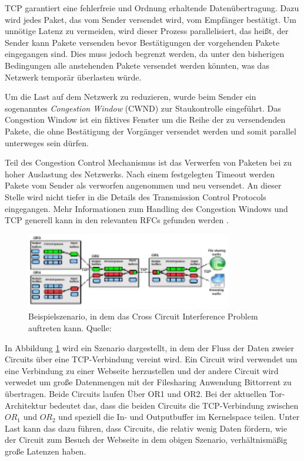 \documentclass[fleqn,envcountsame,runningheads,10pt,a4paper]{llncs}
\begin{document}
TCP garantiert eine fehlerfreie und Ordnung erhaltende Datenübertragung. Dazu 
wird jedes Paket, das vom Sender versendet wird, vom Empfänger bestätigt. Um 
unnötige Latenz zu vermeiden, wird dieser Prozess parallelisiert, das heißt, der 
Sender kann Pakete versenden bevor Bestätigungen der vorgehenden Pakete 
eingegangen sind. Dies muss jedoch begrenzt werden, da unter den bisherigen 
Bedingungen alle anstehenden Pakete versendet werden könnten, was das Netzwerk 
temporär überlasten würde.

Um die Last auf dem Netzwerk zu reduzieren, wurde beim Sender ein sogenanntes 
\textit{Congestion Window} (CWND) zur Staukontrolle eingeführt. Das Congestion 
Window ist ein fiktives Fenster um die Reihe der zu versendenden Pakete, die 
ohne Bestätigung der Vorgänger versendet werden und somit parallel unterweges 
sein dürfen.

Teil des Congestion Control Mechanismus ist das Verwerfen von Paketen bei zu 
hoher Auslastung des Netzwerks. Nach einem festgelegten Timeout werden Pakete 
vom Sender als verworfen angenommen und neu versendet. An dieser Stelle wird 
nicht tiefer in die Details des Transmission Control Protocols eingegangen. Mehr 
Informationen zum Handling des Congestion Windows und TCP generell kann in den 
relevanten RFCs gefunden werden \cite{rfc:tcp, rfc:tcpcc}.

\begin{figure}[h]
  \begin{center}
    \includegraphics[width=0.8\textwidth]{pics/BufferPic.pdf}
    \caption{Beispielszenario, in dem das Cross Circuit Interference Problem auftreten kann. Quelle: \cite{pctcp} }
    \label{fig:buffer} 
  \end{center} 
\end{figure} 

In Abbildung \ref{fig:buffer} wird ein Szenario dargestellt, in dem der Fluss 
der Daten zweier Circuits über eine TCP-Verbindung vereint wird. Ein Circuit 
wird verwendet um eine Verbindung zu einer Webseite herzustellen und der andere 
Circuit wird verwedet um große Datenmengen mit der Filesharing Anwendung 
Bittorrent zu übertragen. Beide Circuits laufen Über OR1 und OR2. Bei der 
aktuellen Tor-Architektur bedeutet das, dass die beiden Circuits die 
TCP-Verbindung zwischen $\textit{OR}_1$ und $\textit{OR}_2$ und speziell die In- 
und Outputbuffer im Kernelspace teilen. Unter Last kann das dazu führen, dass 
Circuits, die relativ wenig Daten fördern, wie der Circuit zum Besuch der 
Webseite in dem obigen Szenario, verhältnismäßig große Latenzen haben.
\end{document}
